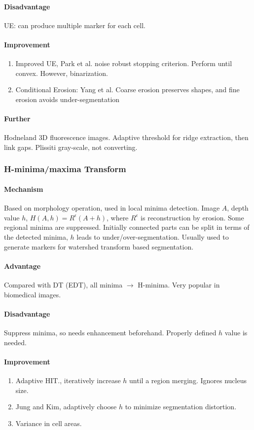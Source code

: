 \documentclass[10pt,a4paper]{article}
\begin{document}
\paragraph{Disadvantage}UE: can produce multiple marker for each cell.
\paragraph{Improvement}
\begin{enumerate}
	\item Improved UE, Park et al. noise robust stopping criterion. Perform until convex. However, binarization.
	\item Conditional Erosion: Yang et al. Coarse erosion preserves shapes, and fine erosion avoids under-segmentation
\end{enumerate}
\paragraph{Further}
Hodneland 3D fluorescence images. Adaptive threshold for ridge extraction, then link gaps. Plissiti gray-scale, not converting.

\subsubsection{H-minima/maxima Transform}
\paragraph{Mechanism}
Based on morphology operation, used in local minima detection. Image $A$, depth value $h$, $H(A,h)=R^{\epsilon}(A+h)$, where $R^{\epsilon}$ is reconstruction by erosion. Some regional minima are suppressed. Initially connected parts can be split in terms of the detected minima, $h$ leads to under/over-segmentation. Usually used to generate markers for watershed transform based segmentation.
\paragraph{Advantage}
Compared with DT (EDT), all minima $\to$ H-minima. Very popular in biomedical images.
\paragraph{Disadvantage}
Suppress minima, so needs enhancement beforehand. Properly defined $h$ value is needed.
\paragraph{Improvement}
\begin{enumerate}
	\item Adaptive HIT., iteratively increase $h$ until a region merging. Ignores nucleus size.
	\item Jung and Kim, adaptively choose $h$ to minimize segmentation distortion.
	\item Variance in cell areas.
\end{enumerate}
\end{document}
